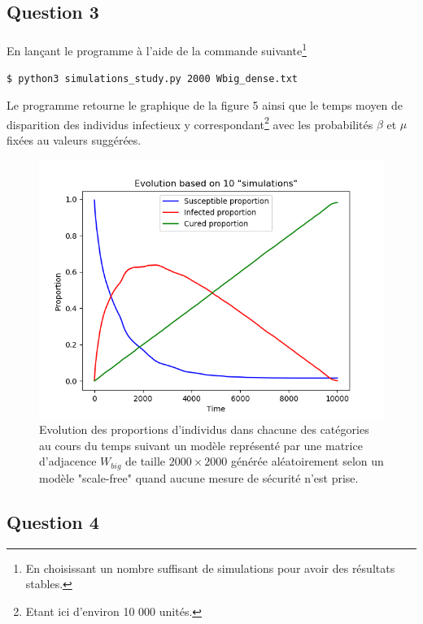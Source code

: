 \documentclass[a4paper, 12pt, oneside]{article}
\begin{document}
\subsection{Question 3}

\paragraph{}En lançant le programme à l'aide de la commande suivante\footnote{En choisissant un nombre suffisant de simulations pour avoir des résultats stables.} 

\begin{lstlisting}[language=bash]
$ python3 simulations_study.py 2000 Wbig_dense.txt 
\end{lstlisting}

\noindent Le programme retourne le graphique de la figure 5 ainsi que le temps moyen de disparition des individus infectieux y correspondant\footnote{Etant ici d'environ 10 000 unités.} avec les probabilités $\beta$ et $\mu$ fixées au valeurs suggérées.

\begin{figure}[H]
	\centering
	\includegraphics[scale=1]{Wbig_dense_simulations.png} 
	\caption{Evolution des proportions d'individus dans chacune des catégories au cours du temps suivant un modèle représenté par une matrice d'adjacence $W_{big}$ de taille $2000 \times 2000$ générée aléatoirement selon un modèle "scale-free" quand aucune mesure de sécurité n'est prise.}
\end{figure}

\subsection{Question 4}
\end{document}
